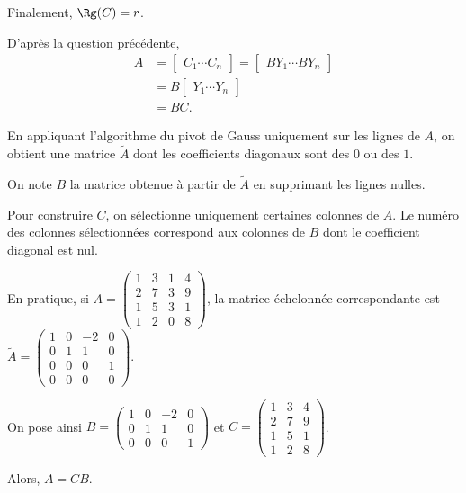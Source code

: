 \begin{solution}
\begin{reponses}
\begin{reponses}
Finalement, $\Rg(C) = r$.

\item D'après la question précédente,
\begin{align*}
A
&= \begin{bmatrix} C_1 \cdots C_n\end{bmatrix}
= \begin{bmatrix} B Y_1 \cdots B Y_n\end{bmatrix}\\
&= B \begin{bmatrix} Y_1 \cdots Y_n\end{bmatrix}\\
&= B C.
\end{align*}
\end{reponses}
\end{reponses}
\end{solution}

\begin{remarque}
En appliquant l'algorithme du pivot de Gauss uniquement sur les lignes de $A$, on obtient une matrice $\tilde{A}$ dont les coefficients diagonaux sont des $0$ ou des $1$.

On note $B$ la matrice obtenue à partir de $\tilde{A}$ en supprimant les lignes nulles.

Pour construire $C$, on sélectionne uniquement certaines colonnes de $A$. Le numéro des colonnes sélectionnées correspond aux colonnes de $B$ dont le coefficient diagonal est nul.

En pratique, si $A = \begin{pmatrix} 1 & 3 & 1 & 4 \\ 2 & 7 & 3 & 9 \\ 1 & 5 & 3 & 1 \\ 1 & 2 & 0 & 8 \end{pmatrix}$, la matrice échelonnée correspondante est $\tilde{A} = \begin{pmatrix} 1 & 0 & -2 & 0 \\ 0 & 1 & 1 & 0 \\ 0 & 0 & 0 & 1 \\ 0 & 0 & 0 & 0\end{pmatrix}$.

On pose ainsi $B = \begin{pmatrix} 1 & 0 & -2 & 0 \\ 0 & 1 & 1 & 0 \\ 0 & 0 & 0 & 1\end{pmatrix}$ et $C = \begin{pmatrix} 1 & 3 & 4 \\ 2 & 7 & 9 \\ 1 & 5 & 1 \\ 1 & 2 & 8\end{pmatrix}$.

Alors, $A = C B$.
\end{remarque}

